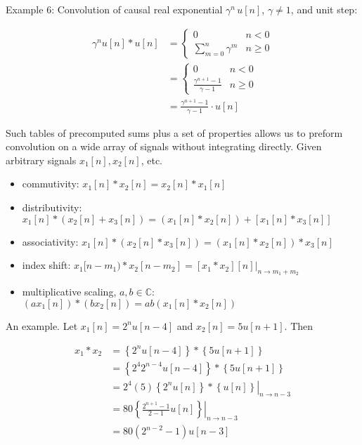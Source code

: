 \documentclass{article}
\begin{document}
Example 6: Convolution of causal real exponential $\gamma^{n}\, u[n]$, $\gamma \neq 1$, and unit step:

\begin{align}
\gamma^{n}u[n] * u[n] &= \left\{\begin{array}{cc}
  0 & n < 0\\
  \sum\limits_{m = 0}^{n} \gamma^{m} & n \geq 0
\end{array}\right.\\
&= \left\{\begin{array}{cc}
  0 & n < 0\\
  \frac{\gamma^{n+1} - 1}{\gamma - 1}  & n \geq 0
\end{array}\right.\\
&= \frac{\gamma^{n+1} - 1}{\gamma - 1} \cdot u[n]
\end{align}

Such tables of precomputed sums plus a set of properties allows us to preform convolution on a wide array of signals without integrating directly. Given arbitrary signals $x_1[n], x_2[n]$, etc.

\begin{itemize}
\item commutivity: $x_1[n] * x_2[n] = x_2[n] * x_1[n]$
\item distributivity: $x_1[n] * (x_2[n] + x_3[n]) = (x_1[n]*x_2[n]) + [x_1[n]*x_3[n]]$
\item associativity: $x_1[n] * (x_2[n] * x_3[n]) = (x_1[n]*x_2[n]) * x_3[n]$
\item index shift: $x_1[n-m_1)*x_2[n-m_2] = \left. [x_1 * x_2][n] \right|_{n\rightarrow m_1 + m_2}$
\item multiplicative scaling, $a,b\in\mathbb{C}$: $(ax_1[n])*(bx_2[n]) = ab(x_1[n] * x_2[n])$ 
\end{itemize}

An example. Let $x_1[n] = 2^nu[n-4]$ and $x_2[n] = 5u[n+1]$. Then

\begin{align}
  x_1 * x_2 &= \left\{ 2^nu[n-4]\right\}* \left\{ 5u[n+1] \right\}\\
  &= \left\{ 2^4 2^{n-4}u[n-4]\right\}* \left\{ 5u[n+1] \right\}\\
  &= \left. 2^4 (5)\left\{ 2^{n}u[n]\right\}* \left\{u[n] \right\}\right|_{n \rightarrow n-3}\\
  &= \left. 80 \left\{ \frac{2^{n+1} - 1}{2 - 1}u[n]\right\}\right|_{n \rightarrow n-3}\\
  &= 80\left( 2^{n-2} - 1\right)u[n-3]
\end{align}
\end{document}
